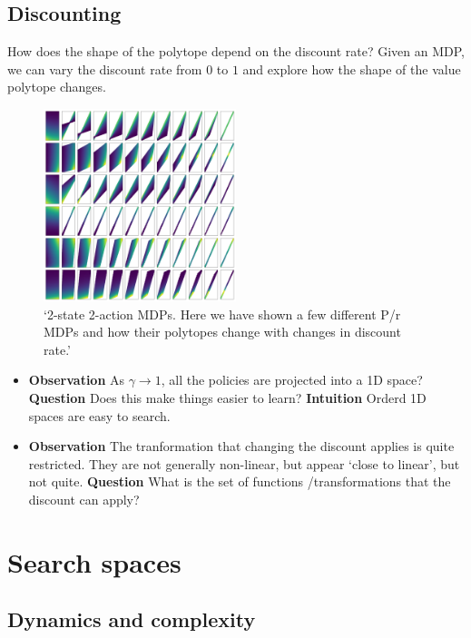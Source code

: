 \subsection{Discounting}

How does the shape of the polytope depend on the discount rate? Given an
MDP, we can vary the discount rate from \(0\) to \(1\) and explore how
the shape of the value polytope changes.

\begin{figure}
\centering
\includegraphics[width=0.5\textwidth,height=0.5\textheight]{../../pictures/figures/discounts.png}
\caption{`2-state 2-action MDPs. Here we have shown a few different P/r
MDPs and how their polytopes change with changes in discount rate.'}
\end{figure}

\begin{itemize}
\item
  \textbf{Observation} As \(\gamma \to 1\), all the policies are
  projected into a 1D space? \textbf{Question} Does this make things
  easier to learn? \textbf{Intuition} Orderd 1D spaces are easy to
  search.
\item
  \textbf{Observation} The tranformation that changing the discount
  applies is quite restricted. They are not generally non-linear, but
  appear `close to linear', but not quite. \textbf{Question} What is the
  set of functions /transformations that the discount can apply?
\end{itemize}


\section{Search spaces}
\subsection{Dynamics and complexity}


